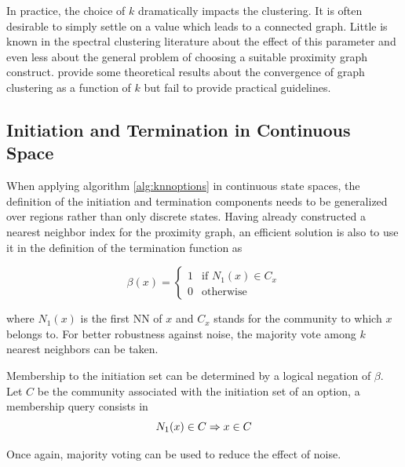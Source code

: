 In practice, the choice of $k$ dramatically impacts the clustering. It is often desirable to simply settle on a value which leads to a connected graph. Little is known in the spectral clustering literature about the effect of this parameter and even less about the general problem of choosing a suitable proximity graph construct. \cite{Maier2008} provide some theoretical results about the convergence of graph clustering as a function of $k$ but fail to provide practical guidelines. 

\subsection{Initiation and Termination in Continuous Space}
\label{sec:knnoptions}
When applying algorithm \ref{alg:knnoptions} in continuous state spaces, the definition of the initiation and termination components needs to be generalized over regions rather than only discrete states. Having already constructed a nearest neighbor index for  the proximity graph, an efficient solution is also to use it in the definition of the termination function as

\begin{equation}
\beta(x) = 
\begin{cases}
1 & \text{if } N_1(x) \in C_x\\
0 & \text{otherwise}
\end{cases}
\end{equation}

where $N_1(x)$ is the first NN of $x$ and $C_x$ stands for the community to which $x$ belongs to. For better robustness against noise, the majority vote among $k$ nearest neighbors can be taken.

Membership to the initiation set can be determined by a logical negation of $\beta$. Let $C$ be the community associated with the initiation set of an option, a membership query consists in
\begin{equation}
N_1(x) \in C \Rightarrow x \in C  \\
\end{equation}

Once again, majority voting can be used to reduce the effect of noise. 
